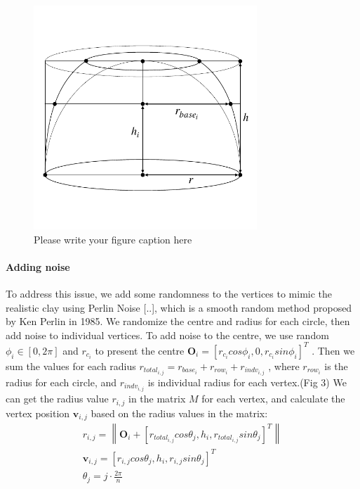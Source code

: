 \begin{figure}
  \includegraphics[width=0.75\textwidth]{f1.pdf}
\caption{Please write your figure caption here}
\label{fig:1}       %
\end{figure}

\paragraph{Adding noise} To address this issue, we add some randomness to the vertices to mimic the realistic clay using Perlin Noise [..], which is a smooth random method proposed by Ken Perlin in 1985. We randomize the centre and radius for each circle, then add noise to individual vertices.
To add noise to the centre, we use random $\phi_{i} \in [0, 2\pi]$ and $r_{c_{i}}$ to present the centre
$\mathbf{O}_{i} = \left[r_{c_{i}}cos\phi_{i}, 0, r_{c_{i}}sin\phi_{i}\right]^T$
. Then we sum the values for each radius
$r_{total_{i,j}} = r_{base_{i}} + r_{row_{i}} + r_{indv_{i,j}}$
, where $r_{row_{i}}$ is the radius for each circle, and $r_{indv_{i,j}}$ is individual radius for each vertex.(Fig 3) We can get the radius value $r_{i,j}$ in the matrix $M$ for each vertex, and calculate the vertex position $\mathbf{v}_{i,j}$ based on the radius values in the matrix:
\begin{equation}
\begin{split}
r_{i,j} = \left\|
\mathbf{O}_{i} + \left[ r_{total_{i,j}} cos \theta_{j},
h_{i},
r_{total_{i,j}} sin \theta_{j}
\right]^T
\right\| \\
\mathbf{v}_{i,j} =
\left[r_{i,j}  cos \theta_{j},
h_{i},
r_{i,j} sin \theta_{j}\right]^T \\
\theta_{j} = j \cdot \frac{2\pi}{n}
\end{split}
\end{equation}

